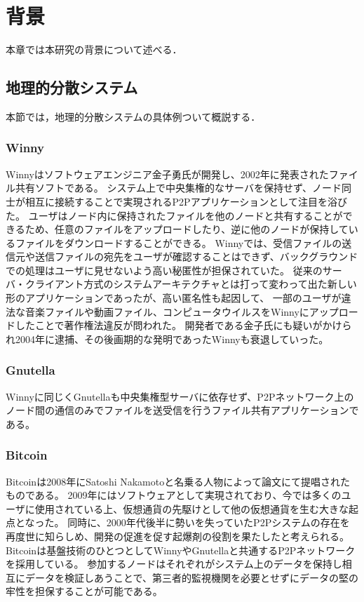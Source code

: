 \chapter{背景}
\label{background}

本章では本研究の背景について述べる．

\section{地理的分散システム}
\label{background:geographically-disdtributed-system}
本節では，地理的分散システムの具体例ついて概説する．

\subsection{Winny}
Winnyはソフトウェアエンジニア金子勇氏が開発し、2002年に発表されたファイル共有ソフトである。
システム上で中央集権的なサーバを保持せず、ノード同士が相互に接続することで実現されるP2Pアプリケーションとして注目を浴びた。
ユーザはノード内に保持されたファイルを他のノードと共有することができるため、任意のファイルをアップロードしたり、逆に他のノードが保持しているファイルをダウンロードすることができる。
Winnyでは、受信ファイルの送信元や送信ファイルの宛先をユーザが確認することはできず、バックグラウンドでの処理はユーザに見せないよう高い秘匿性が担保されていた。
従来のサーバ・クライアント方式のシステムアーキテクチャとは打って変わって出た新しい形のアプリケーションであったが、高い匿名性も起因して、
一部のユーザが違法な音楽ファイルや動画ファイル、コンピュータウイルスをWinnyにアップロードしたことで著作権法違反が問われた。
開発者である金子氏にも疑いがかけられ2004年に逮捕、その後画期的な発明であったWinnyも衰退していった。

\subsection{Gnutella}
Winnyに同じくGnutellaも中央集権型サーバに依存せず、P2Pネットワーク上のノード間の通信のみでファイルを送受信を行うファイル共有アプリケーションである。

\subsection{Bitcoin}
Bitcoinは2008年にSatoshi Nakamotoと名乗る人物によって論文にて提唱されたものである。
2009年にはソフトウェアとして実現されており、今では多くのユーザに使用されている上、仮想通貨の先駆けとして他の仮想通貨を生む大きな起点となった。
同時に、2000年代後半に勢いを失っていたP2Pシステムの存在を再度世に知らしめ、開発の促進を促す起爆剤の役割を果たしたと考えられる。
Bitcoinは基盤技術のひとつとしてWinnyやGnutellaと共通するP2Pネットワークを採用している。
参加するノードはそれぞれがシステム上のデータを保持し相互にデータを検証しあうことで、第三者的監視機関を必要とせずにデータの堅の牢性を担保することが可能である。

